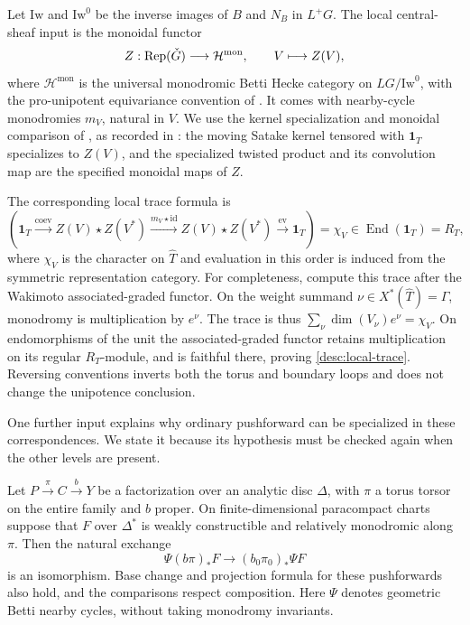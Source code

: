 Let $\mathrm{Iw}$ and $\mathrm{Iw}^0$ be the inverse images of $B$ and
$N_B$ in $L^+G$.  The local central-sheaf input is the monoidal functor
\[
 Z:\operatorname{Rep}(\check G)\longrightarrow\mathcal H^{\mathrm{mon}},\qquad V\longmapsto Z(V),
\]
where $\mathcal H^{\mathrm{mon}}$ is the universal monodromic Betti
Hecke category on $LG/\mathrm{Iw}^0$, with the pro-unipotent
equivariance convention of \cite{DT}.  It comes with nearby-cycle
monodromies $m_V$, natural in $V$.  We use the kernel specialization
and monoidal comparison of \cite[Proposition~6.3.1 and
Lemma~6.3.2]{DT}, as recorded in \cite[Sections~7.2 and~7.4]{CT}:
the moving Satake kernel tensored with $\mathbf1_T$ specializes to
$Z(V)$, and the specialized twisted product and its convolution map
are the specified monoidal maps of $Z$.

The corresponding local trace formula is
\begin{equation}\label{desc:local-trace}
 \left(\mathbf1_T\xrightarrow{\mathrm{coev}}Z(V)\star Z(V^*)
 \xrightarrow{m_V\star\mathrm{id}}Z(V)\star Z(V^*)
 \xrightarrow{\mathrm{ev}}\mathbf1_T\right)
                 =\chi_V\in\operatorname{End}(\mathbf1_T)=R_T,
\end{equation}
where $\chi_V$ is the character on $\widehat T$ and evaluation in this
order is induced from the symmetric representation category.
For completeness, \cite[Propositions~5.3.1 and~9.3.1(a)--(c)]{DT}
compute this trace after the Wakimoto associated-graded functor.
On the weight summand $\nu\in X^*(\widehat T)=\Gamma$, monodromy is
multiplication by $e^\nu$.  The trace is thus
$\sum_\nu\dim(V_\nu)e^\nu=\chi_V$.  On endomorphisms of the unit the
associated-graded functor retains multiplication on its regular
$R_T$-module, and is faithful there, proving
\eqref{desc:local-trace}.  Reversing conventions inverts both the
torus and boundary loops and does not change the unipotence conclusion.

One further input explains why ordinary pushforward can be
specialized in these correspondences.  We state it because its
hypothesis must be checked again when the other levels are present.

\begin{lemma}\label{desc:exchange}
Let $P\xrightarrow{\pi}C\xrightarrow{b}Y$ be a factorization over an
analytic disc $\Delta$, with $\pi$ a torus torsor on the entire family
and $b$ proper.  On finite-dimensional paracompact charts suppose that
$F$ over $\Delta^*$ is weakly constructible and relatively monodromic
along $\pi$.  Then the natural exchange
\begin{equation}\label{desc:push-exchange}
            \Psi(b\pi)_*F\longrightarrow(b_0\pi_0)_*\Psi F
\end{equation}
is an isomorphism.  Base change and projection formula for these
pushforwards also hold, and the comparisons respect composition.
Here $\Psi$ denotes geometric Betti nearby cycles, without taking
monodromy invariants.
\end{lemma}

